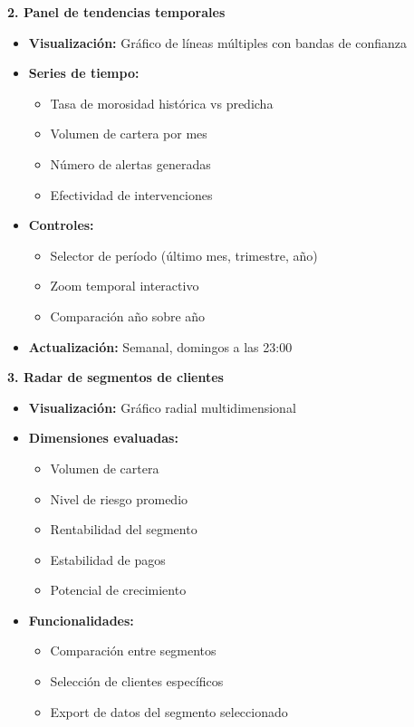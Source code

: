 \textbf{2. Panel de tendencias temporales}
\begin{itemize}
    \item \textbf{Visualización:} Gráfico de líneas múltiples con bandas de confianza
    \item \textbf{Series de tiempo:}
    \begin{itemize}
        \item Tasa de morosidad histórica vs predicha
        \item Volumen de cartera por mes
        \item Número de alertas generadas
        \item Efectividad de intervenciones
    \end{itemize}
    \item \textbf{Controles:}
    \begin{itemize}
        \item Selector de período (último mes, trimestre, año)
        \item Zoom temporal interactivo
        \item Comparación año sobre año
    \end{itemize}
    \item \textbf{Actualización:} Semanal, domingos a las 23:00
\end{itemize}

\textbf{3. Radar de segmentos de clientes}
\begin{itemize}
    \item \textbf{Visualización:} Gráfico radial multidimensional
    \item \textbf{Dimensiones evaluadas:}
    \begin{itemize}
        \item Volumen de cartera
        \item Nivel de riesgo promedio
        \item Rentabilidad del segmento
        \item Estabilidad de pagos
        \item Potencial de crecimiento
    \end{itemize}
    \item \textbf{Funcionalidades:}
    \begin{itemize}
        \item Comparación entre segmentos
        \item Selección de clientes específicos
        \item Export de datos del segmento seleccionado
    \end{itemize}
\end{itemize}

